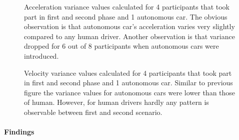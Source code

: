 \documentclass[11pt,english,twoside]{article}
\begin{document}
\begin{figure}[!] %
\caption{Acceleration variance values calculated for 4 participants that took part in first and second phase and 1 autonomous car. The obvious observation is that autonomous car's acceleration varies very slightly compared to any human driver. Another observation is that variance dropped for 6 out of 8 participants when autonomous cars were introduced.}
\label{fig:acc_var}
\end{figure}


\begin{figure}[!] %
\caption{Velocity variance values calculated for 4 participants that took part in first and second phase and 1 autonomous car. Similar to previous figure the variance values for autonomous cars were lower than those of human. However, for human drivers hardly any pattern is observable between first and second scenario.}
\label{fig:vel_var}
\end{figure} 


\paragraph{Findings}
\end{document}
